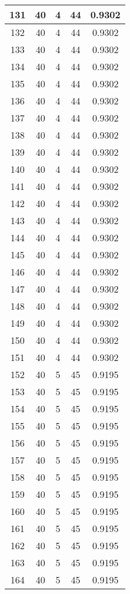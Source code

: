 \documentclass[letterpaper, 12pt]{article}
\begin{document}
\begin{longtable}{|c|c|c|c|c|}
\hline
131 & 40 & 4 & 44 & 0.9302 \\
\hline
132 & 40 & 4 & 44 & 0.9302 \\
\hline
133 & 40 & 4 & 44 & 0.9302 \\
\hline
134 & 40 & 4 & 44 & 0.9302 \\
\hline
135 & 40 & 4 & 44 & 0.9302 \\
\hline
136 & 40 & 4 & 44 & 0.9302 \\
\hline
137 & 40 & 4 & 44 & 0.9302 \\
\hline
138 & 40 & 4 & 44 & 0.9302 \\
\hline
139 & 40 & 4 & 44 & 0.9302 \\
\hline
140 & 40 & 4 & 44 & 0.9302 \\
\hline
141 & 40 & 4 & 44 & 0.9302 \\
\hline
142 & 40 & 4 & 44 & 0.9302 \\
\hline
143 & 40 & 4 & 44 & 0.9302 \\
\hline
144 & 40 & 4 & 44 & 0.9302 \\
\hline
145 & 40 & 4 & 44 & 0.9302 \\
\hline
146 & 40 & 4 & 44 & 0.9302 \\
\hline
147 & 40 & 4 & 44 & 0.9302 \\
\hline
148 & 40 & 4 & 44 & 0.9302 \\
\hline
149 & 40 & 4 & 44 & 0.9302 \\
\hline
150 & 40 & 4 & 44 & 0.9302 \\
\hline
151 & 40 & 4 & 44 & 0.9302 \\
\hline
152 & 40 & 5 & 45 & 0.9195 \\
\hline
153 & 40 & 5 & 45 & 0.9195 \\
\hline
154 & 40 & 5 & 45 & 0.9195 \\
\hline
155 & 40 & 5 & 45 & 0.9195 \\
\hline
156 & 40 & 5 & 45 & 0.9195 \\
\hline
157 & 40 & 5 & 45 & 0.9195 \\
\hline
158 & 40 & 5 & 45 & 0.9195 \\
\hline
159 & 40 & 5 & 45 & 0.9195 \\
\hline
160 & 40 & 5 & 45 & 0.9195 \\
\hline
161 & 40 & 5 & 45 & 0.9195 \\
\hline
162 & 40 & 5 & 45 & 0.9195 \\
\hline
163 & 40 & 5 & 45 & 0.9195 \\
\hline
164 & 40 & 5 & 45 & 0.9195 \\

\end{longtable}
\end{document}
